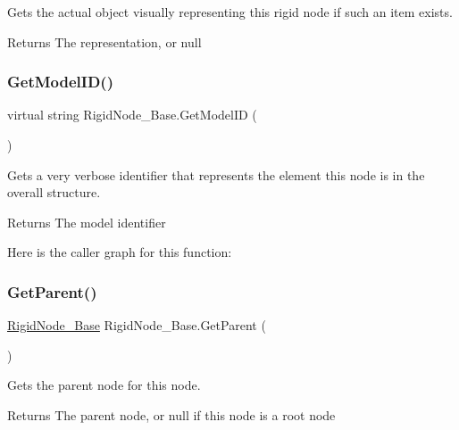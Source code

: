 Gets the actual object visually representing this rigid node if such an item exists. 

\begin{DoxyReturn}{Returns}
The representation, or null
\end{DoxyReturn}
\mbox{\label{class_rigid_node___base_a98a362b9ae0cf05e4c1f9db70bcf89c5}} 
\subsubsection{\texorpdfstring{Get\+Model\+I\+D()}{GetModelID()}}
{\footnotesize\ttfamily virtual string Rigid\+Node\+\_\+\+Base.\+Get\+Model\+ID (\begin{DoxyParamCaption}{ }\end{DoxyParamCaption})\hspace{0.3cm}{\ttfamily [virtual]}}



Gets a very verbose identifier that represents the element this node is in the overall structure. 

\begin{DoxyReturn}{Returns}
The model identifier
\end{DoxyReturn}
Here is the caller graph for this function\+:
\mbox{\label{class_rigid_node___base_a8889037fe9b28dbebcdcf670899406b4}} 
\subsubsection{\texorpdfstring{Get\+Parent()}{GetParent()}}
{\footnotesize\ttfamily \hyperlink{class_rigid_node___base}{Rigid\+Node\+\_\+\+Base} Rigid\+Node\+\_\+\+Base.\+Get\+Parent (\begin{DoxyParamCaption}{ }\end{DoxyParamCaption})}



Gets the parent node for this node. 

\begin{DoxyReturn}{Returns}
The parent node, or null if this node is a root node
\end{DoxyReturn}
\mbox{\label{class_rigid_node___base_a6f26d5cf2ff78a2066913e81df473abf}} 
